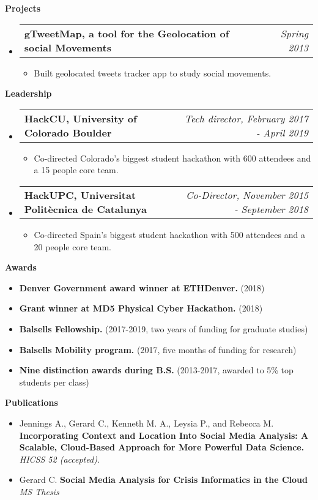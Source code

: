 \documentclass[letterpaper,10pt]{article}
\makeatletter
\newcommand{\resitem}[1]{\item #1 \vspace{-2pt}}
\newcommand{\resheading}[1]{{\large \colorbox{mygrey}{\begin{minipage}{\textwidth}{\textbf{#1 \vphantom{p\^{E}}}}\end{minipage}}}}
\newcommand{\ressubheading}[4]{
\begin{tabular*}{7.0in}{l@{\extracolsep{\fill}}r}
		\textbf{#1} & \textit{#4} \\
\end{tabular*}\vspace{-6pt}}
\makeatother
\begin{document}
\resheading{Projects}
	\begin{itemize}
		\item
			\ressubheading{gTweetMap, a tool for the Geolocation of social Movements}{Barcelona, Spain}{Student}{Spring 2013}
			\begin{itemize}
				\resitem{Built geolocated tweets tracker app to study social movements.}
			\end{itemize}
	\end{itemize}

\resheading{Leadership}
	\begin{itemize}
		\item 
			\ressubheading{HackCU, University of Colorado Boulder}{Boulder, CO}{Tech director}{Tech director, February 2017 - April 2019}
			\begin{itemize}
				\resitem{Co-directed Colorado's biggest student hackathon with 600 attendees and a 15 people core team.}
			\end{itemize}
		\item
			\ressubheading{HackUPC, Universitat Polit\`ecnica de Catalunya}{Barcelona, Spain}{Co-Director and organizer}{Co-Director, November 2015 - September 2018}
			\begin{itemize}
				\resitem{Co-directed Spain's biggest student hackathon with 500 attendees and a 20 people core team.}
			\end{itemize}
	\end{itemize}

\resheading{Awards}
	\begin{itemize}
		\resitem{\textbf{Denver Government award winner at ETHDenver.} (2018)}
		\resitem{\textbf{Grant winner at MD5 Physical Cyber Hackathon.} (2018)}
		\resitem{\textbf{Balsells Fellowship.} (2017-2019, two years of funding for graduate studies)}
		\resitem{\textbf{Balsells Mobility program.} (2017, five months of funding for research)}
		\resitem{\textbf{Nine distinction awards during B.S.} (2013-2017, awarded to 5\% top students per class)}
	\end{itemize}

\resheading{Publications}
	\begin{itemize}
		\item 	Jennings A., Gerard C., Kenneth M. A., Leysia P., and Rebecca M.  \textbf{Incorporating Context and Location Into Social Media Analysis: A Scalable, Cloud-Based Approach for More Powerful Data Science.}  \textit{HICSS 52 (accepted).}
        \item Gerard C. \textbf{Social Media Analysis for Crisis Informatics in the Cloud} \textit{MS Thesis}
	\end{itemize}
\end{document}
